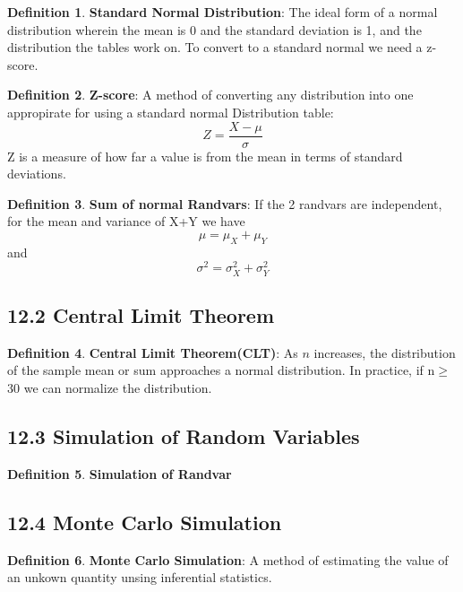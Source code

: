 \documentclass[12pt]{amsart}
\theoremstyle{definition}
\newtheorem{definition}{Definition} %
\numberwithin{equation}{theorem}    %
\begin{document}
\begin{definition}
    \textbf{Standard Normal Distribution}:
    The ideal form of a normal distribution wherein the mean is 0 and the standard deviation is 1, and the distribution the tables work on. To convert to a standard normal we need a z-score.
\end{definition}


\begin{definition}
    \textbf{Z-score}:
    A method of converting any distribution into one appropirate for using a standard normal Distribution table:
    $$Z = \frac{X-\mu}{\sigma}$$
    Z is a measure of how far a value is from the mean in terms of standard deviations.
\end{definition}


\begin{definition}
    \textbf{Sum of normal Randvars}:
    If the 2 randvars are independent, for the mean and variance of X+Y we have 
    $$\mu = \mu_X + \mu_Y$$
    and $$\sigma^2 = \sigma_X^2 + \sigma_Y^2$$
\end{definition}

\subsection*{12.2 Central Limit Theorem}

\begin{definition}
    \textbf{Central Limit Theorem(CLT)}:
    As $n$ increases, the distribution of the sample mean or sum approaches a normal distribution. In practice, if n$\geq$30 we can normalize the distribution.
\end{definition}


\subsection*{12.3 Simulation of Random Variables}

\begin{definition}
    \textbf{Simulation of Randvar}
\end{definition}


\subsection*{12.4 Monte Carlo Simulation}

\begin{definition}
    \textbf{Monte Carlo Simulation}:
    A method of estimating the value of an unkown quantity unsing inferential statistics.
\end{definition}
\end{document}
